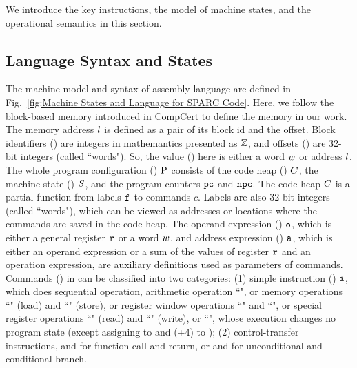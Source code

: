 We introduce the key \sparc{} instructions, the model of machine
states, and the operational semantics in this section.

\subsection{Language Syntax and States}
\label{subsec:syntax}

The machine model and syntax of \sparc{} assembly language
are defined in Fig.~\ref{fig:Machine States and Language for SPARC Code}.
Here, we follow the block-based memory \cite{CompCertMM} introduced
in CompCert to define the memory in our work.
The memory address $l$ is defined as a pair of
its block id and the offset. Block identifiers 
() are integers
in mathemantics presented as $\mathbb{Z}$, 
and offsets ()
are 32-bit integers (called ``words").
So, the value () here 
is either a word $w$ or address $l$.
The whole program configuration ()
$\text{P}$ consists of the code heap ()
$C$, the machine state () $S$, 
and the program counters $\texttt{pc}$ and $\texttt{npc}$.
The code heap $C$ is a partial function
from labels $\texttt{f}_{}$ to commands $c$.
Labels are also 32-bit integers (called ``words"),
which can be viewed as addresses or locations
where the commands are saved in the code heap.
The operand expression ()
$\texttt{o}$, which is either a general
register $\texttt{r}_{}$ or a word $w$,
and address expression () $\texttt{a}$,
which is either an operand expression or a
sum of the values of register $\texttt{r}_{}$ and an operation
expression, are auxiliary definitions used as parameters of commands.
Commands () in \sparc{} can be classified into two categories:
(1) simple instruction ()
$\texttt{i}{}$, which does sequential
operation, \eg{} arithmetic operation ``\cadd{}",
or memory operations
``\ld{}" (load) and ``\st{}" (store), or register window
operations ``\csave{}" and ``\crestore{}", or special
register operations ``\rd{}" (read) and ``\cwr{}" (write), 
or ``\nop{}", whose execution changes no program state
(except assigning \npc{} to \pc{} and (\npc{}+4) to \npc{});
(2) control-transfer instructions,
\eg{} \call{} and \retl{} for
function call and return, or \jmp{} and \be{} for
unconditional and conditional branch.

